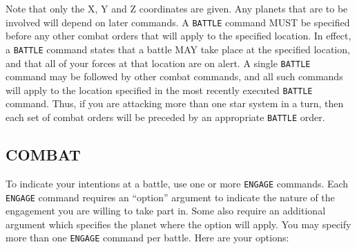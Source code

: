\documentclass[10pt,titlepage]{article}
\begin{document}
Note that only the X, Y and Z coordinates are given.  Any planets that are to
be involved will depend on later commands.  A \texttt{BATTLE} command MUST be specified
before any other combat orders that will apply to the specified location.  In
effect, a \texttt{BATTLE} command states that a battle MAY take place at the specified
location, and that all of your forces at that location are on alert.  A single
\texttt{BATTLE} command may be followed by other combat commands, and all such commands
will apply to the location specified in the most recently executed \texttt{BATTLE}
command.  Thus, if you are attacking more than one star system in a turn, then
each set of combat orders will be preceded by an appropriate \texttt{BATTLE} order.


\subsection{COMBAT}
\label{sec:combat}


To indicate your intentions at a battle, use one or more \texttt{ENGAGE} commands.  Each
\texttt{ENGAGE} command requires an ``option'' argument to indicate the nature of the
engagement you are willing to take part in.  Some also require an additional
argument which specifies the planet where the option will apply.  You may
specify more than one \texttt{ENGAGE} command per battle.  Here are your options:
\end{document}
